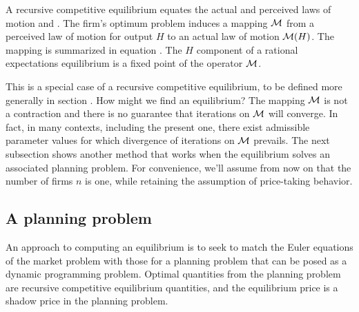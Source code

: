 \medskip
 A recursive competitive equilibrium
%
equates the actual and perceived laws of motion 
and .
 The firm's optimum problem induces a mapping ${\cal M}$
from a perceived law of motion for output $H$ to an actual
law of motion ${\cal M}(H)$.  The mapping is summarized in equation
.  The $H$ component of a  rational expectations equilibrium
is a fixed point of the operator ${\cal M}$.

This is a special case
of a recursive competitive equilibrium, to be defined
more generally in section  .
   How might we find an equilibrium?  The mapping ${\cal M}$ is not a contraction and  there is no guarantee that  iterations
   on ${\cal M}$ will converge.
   In fact, in many contexts, including the present one, there exist admissible parameter values for which divergence of iterations on ${\cal M}$
   prevails.  The next subsection
shows another  method that works when the equilibrium solves
an associated planning problem.
For convenience, we'll assume from now on   that the number of firms $n$ is one, while
retaining the assumption of price-taking behavior.
%
%
%
%

\subsection{A planning problem}

An approach to computing an equilibrium is to seek to match the Euler equations
of the market problem with those for a planning problem that can
be posed as a  dynamic programming problem.
Optimal quantities from  the planning problem are 
recursive competitive equilibrium quantities, and the equilibrium
price is a  shadow price in the planning problem.

